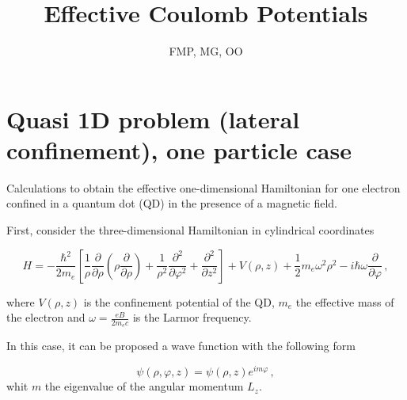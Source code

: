 \documentclass[a4paper,10pt]{article}
\title{Effective Coulomb Potentials}
\author{FMP, MG, OO}
\begin{document}
\renewcommand{\labelenumi}{\bf \alph{enumi})}
\renewcommand{\labelenumii}{\alph{enumi}$_\arabic{enumii}$)}
\newcommand{\ve}[1]{\mathbf{#1}}
\newcommand{\prob}[1]{ \stepcounter{problema}\noindent{\bf Problema
\arabic{problema}:}{\it#1}}
\newcommand{\versor}[1]{\,\hat{\!#1}}
\newcommand{\titulo}[1]{\noindent\begin{Large}{\bfseries\underline{#1}}\end{
Large} \\}
\newcommand{\subtitulo}[1]{\noindent\begin{large}{$\bullet$\scshape
#1}\end{large} \\}
\newcommand{\ket}[1]{\left| #1 \right\rangle}
\newcommand{\bra}[1]{\left\langle #1 \right|}
\newcommand{\braket}[3]{\left\langle #1 \right| #2 \left| #3 \right\rangle}
\newcommand{\overlap}[2]{\left\langle #1 \right| \left. #2 \right\rangle}
\maketitle


\section*{Quasi 1D problem (lateral confinement), one particle case}

Calculations to obtain the effective one-dimensional Hamiltonian for one
electron confined in a quantum dot (QD) in the presence of a magnetic field.

First, consider the three-dimensional Hamiltonian in cylindrical coordinates

\begin{equation}
H = -\frac{\hbar^2}{2 m_e}\left[\frac{1}{\rho}\frac{\partial}{\partial \rho}\left(\rho \frac{\partial}{\partial \rho} \right)
+ \frac{1}{\rho^2}\frac{\partial^2}{\partial \varphi^2}+\frac{\partial^2}{\partial z^2} \right] + V(\rho, z)
+ \frac{1}{2} m_e \omega^2 \rho^2 - i \hbar \omega \frac{\partial}{\partial \varphi}\, ,
\end{equation}

\noindent
where $V(\rho,z)$ is the confinement potential of the QD, $m_e$ the effective mass of the electron and
$\omega = \frac{e B}{2 m_e c}$ is the Larmor frequency.

In this case, it can be proposed a wave function with the following form

\begin{equation}
\psi(\rho,\varphi,z) = \psi(\rho,z) e^{i m \varphi}\,,
\end{equation}
\noindent whit $m$ the eigenvalue of the angular momentum $L_z$.
\end{document}
